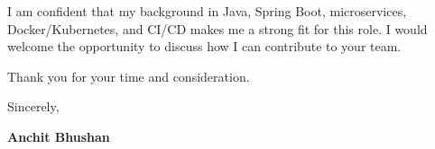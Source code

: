 \documentclass[letterpaper,10pt]{article}
\begin{document}
I am confident that my background in Java, Spring Boot, microservices, Docker/Kubernetes, and CI/CD makes me a strong fit for this role. I would welcome the opportunity to discuss how I can contribute to your team.

Thank you for your time and consideration.

\vspace{16pt}

Sincerely,

\vspace{24pt}

\textbf{Anchit Bhushan}
\end{document}
